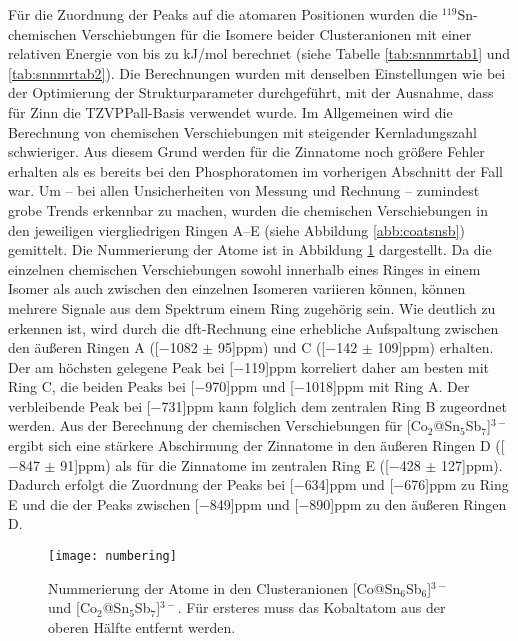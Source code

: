 Für die Zuordnung der Peaks auf die atomaren Positionen wurden die $^{119}$Sn-chemischen Verschiebungen für die Isomere beider Clusteranionen mit einer relativen Energie von bis zu \unit[10]{kJ/mol} berechnet (siehe Tabelle \ref{tab:snnmrtab1} und \ref{tab:snnmrtab2}). Die Berechnungen wurden mit denselben Einstellungen wie bei der Optimierung der Strukturparameter durchgeführt, mit der Ausnahme, dass für Zinn die TZVPPall-Basis\supercite{ahlrichs2000contracted} verwendet wurde. Im Allgemeinen wird die Berechnung von chemischen Verschiebungen mit steigender Kernladungszahl schwieriger. Aus diesem Grund werden für die Zinnatome noch größere Fehler erhalten als es bereits bei den Phosphoratomen im vorherigen Abschnitt der Fall war. Um -- bei allen Unsicherheiten von Messung und Rechnung -- zumindest grobe Trends erkennbar zu machen, wurden die chemischen Verschiebungen in den jeweiligen viergliedrigen Ringen A--E (siehe Abbildung \ref{abb:coatsnsb}) gemittelt. Die Nummerierung der Atome ist in Abbildung \ref{abb:numbering} dargestellt. Da die einzelnen chemischen Verschiebungen sowohl innerhalb eines Ringes in einem Isomer als auch zwischen den einzelnen Isomeren variieren können, können mehrere Signale aus dem Spektrum einem Ring zugehörig sein. Wie deutlich zu erkennen ist, wird durch die \ac{dft}\--Rechnung eine erhebliche Aufspaltung zwischen den äußeren Ringen A (\unit[$-$1082 $\pm$ 95]{ppm}) und C (\unit[$-$142 $\pm$ 109]{ppm}) erhalten. Der am höchsten gelegene Peak bei \unit[$-$119]{ppm} korreliert daher am besten mit Ring C, die beiden Peaks bei \unit[$-$970]{ppm} und \unit[$-$1018]{ppm} mit Ring A. Der verbleibende Peak bei \unit[$-$731]{ppm} kann folglich dem zentralen Ring B zugeordnet werden. Aus der Berechnung der chemischen Verschiebungen für [Co$_2$@Sn$_5$Sb$_7$]$^{3-}$ ergibt sich eine stärkere Abschirmung der Zinnatome in den äußeren Ringen D (\unit[$-$847 $\pm$ 91]{ppm}) als für die Zinnatome im zentralen Ring E (\unit[$-$428 $\pm$ 127]{ppm}). Dadurch erfolgt die Zuordnung der Peaks bei \unit[$-$634]{ppm} und \unit[$-$676]{ppm} zu Ring E und die der Peaks zwischen \unit[$-$849]{ppm} und \unit[$-$890]{ppm} zu den äußeren Ringen D. 
\vspace{20pt}
\begin{figure}[ht!]
	\centering
	\texttt{[image: numbering]}
	\captionsetup{figurewithin = chapter}
	\captionsetup{font=small, labelfont=bf}\caption[Nummerierung der Atome in {[Co@Sn$_6$Sb$_6$]$^{3-}$} und {[Co$_2$@Sn$_5$Sb$_7$]$^{3-}$} ]{Nummerierung der Atome in den Clusteranionen [Co@Sn$_6$Sb$_6$]$^{3-}$ und [Co$_2$@Sn$_5$Sb$_7$]$^{3-}$. Für ersteres muss das Kobaltatom aus der oberen Hälfte entfernt werden.}
\label{abb:numbering}
\end{figure}
\vfill
\newpage

